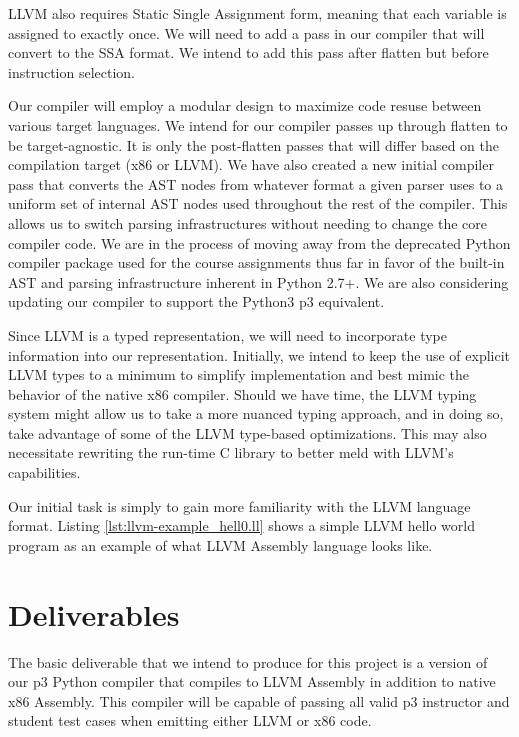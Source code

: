 \documentclass[11pt]{article}
\begin{document}
LLVM also requires Static Single Assignment form,
meaning that each variable is assigned to exactly once.
We will need to add a pass in our compiler that will convert to the
SSA format. We
intend to add this pass after flatten but before instruction
selection.

Our compiler will employ a modular design to maximize code resuse between
various target languages. 
We intend for our compiler passes up through flatten to be
target-agnostic. It is only the post-flatten passes that will differ
based on the compilation target (x86 or LLVM). We have also created a
new initial compiler pass that converts the AST nodes from whatever
format a given parser uses to a uniform set of internal AST nodes used throughout
the rest of the compiler. This allows us to switch parsing
infrastructures without needing to change the core compiler code. We are
in the process of moving away from the deprecated Python compiler package used
for the course assignments thus far in
favor of the built-in AST and parsing infrastructure inherent in Python
2.7+. We are also considering updating our compiler to support the
Python3 p3 equivalent.

Since LLVM is a typed representation, we will need to incorporate
type information into our representation. Initially, we intend to keep
the use of explicit LLVM types to a minimum to simplify implementation
and best mimic the behavior of the native x86 compiler. Should we have
time, the LLVM typing system might allow us to take a more nuanced
typing approach, and in doing so, take advantage of some of the LLVM
type-based optimizations. This may also necessitate rewriting the run-time
C library to better meld with LLVM's capabilities.

Our initial task is simply to gain more familiarity with the LLVM language
format. Listing \ref{lst:llvm-example_hell0.ll} shows
a simple LLVM hello world program as an example of
what LLVM Assembly language looks like.



\section{Deliverables}

The basic deliverable that we intend to produce for this project is a
version of our p3 Python compiler that compiles to LLVM Assembly
in addition to native x86 Assembly. This compiler will be capable of
passing all valid p3 instructor and student test cases when emitting either
LLVM or x86 code.
\end{document}
